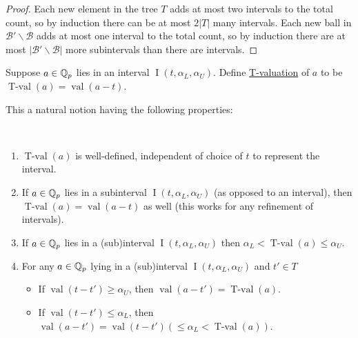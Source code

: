 \documentclass{amsart}
\newcommand{\BB}{\mathscr B}
\newcommand{\paren}[1]{\left(#1\right)}
\DeclareMathOperator{\vval}{val}
\DeclareMathOperator{\tval}{T-val}
\DeclareMathOperator{\inti}{I}
\newcommand{\defn}{\underline}
\newcommand{\interval}{\inti(t, \alpha_L, \alpha_U)}
\begin{document}
\begin{proof}
  Each new element in the tree $T$ adds at most two intervals to the total count,
  so by induction there can be at most $2|T|$ many intervals.
  Each new ball in $\BB' \backslash \BB$ adds at most one interval to the total count,
  so by induction there are at most $|\BB' \backslash \BB|$ more subintervals than there are intervals.
\end{proof}


\begin{Definition}
  Suppose $a \in \mathbb{Q}_p$ lies in an interval $\interval$. 
  Define \defn{T-valuation} of $a$ to be $\tval(a) = \vval(a - t)$.    
\end{Definition}

This a natural notion having the following properties:
\begin{Lemma}  \label{tval} \ 
  \begin{enumerate}[label=(\alph*)]
  \item $\tval(a)$ is well-defined, independent of choice of $t$ to represent the interval.
  \item If $a \in \mathbb{Q}_p$ lies in a subinterval $\interval$ (as opposed to an interval),
    then $\tval(a) = \vval(a - t)$ as well (this works for any refinement of intervals).
  \item If $a \in \mathbb{Q}_p$ lies in a (sub)interval $\interval$ 
    then $\alpha_L < \tval(a) \leq \alpha_U$.
  \item For any $a \in \mathbb{Q}_p$ lying in a (sub)interval $\interval$ and $t' \in T$
    \begin{itemize}
    \item If $\vval(t - t') \geq \alpha_U$, then $\vval(a - t') = \tval(a)$. 
    \item If $\vval(t - t') \leq \alpha_L$, then $\vval(a - t') = \vval(t - t') \paren{\leq \alpha_L < \tval(a)}$. 
    \end{itemize}
  \end{enumerate}
\end{Lemma}
\end{document}
